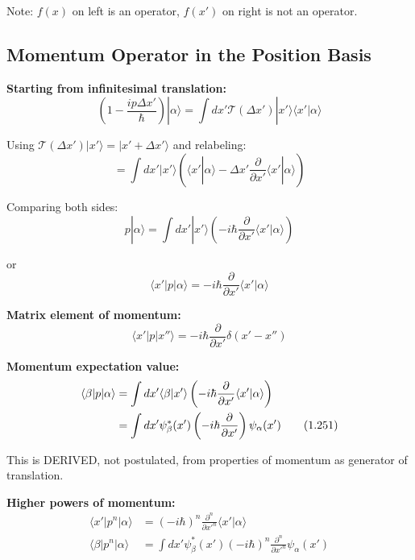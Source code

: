 \documentclass[11pt,a4paper]{article}
\begin{document}
Note: $f(x)$ on left is an operator, $f(x')$ on right is not an operator.

\subsection{Momentum Operator in the Position Basis}

\textbf{Starting from infinitesimal translation:}
\begin{equation}
\left(1 - \frac{ip\Delta x'}{\hbar}\right)|\alpha\rangle = \int dx'\mathcal{T}(\Delta x')|x'\rangle\langle x'|\alpha\rangle
\tag{1.247}
\end{equation}

Using $\mathcal{T}(\Delta x')|x'\rangle = |x' + \Delta x'\rangle$ and relabeling:
\begin{equation}
= \int dx'|x'\rangle\left(\langle x'|\alpha\rangle - \Delta x'\frac{\partial}{\partial x'}\langle x'|\alpha\rangle\right)
\end{equation}

Comparing both sides:
\begin{equation}
\boxed{p|\alpha\rangle = \int dx'|x'\rangle\left(-i\hbar\frac{\partial}{\partial x'}\langle x'|\alpha\rangle\right)}
\tag{1.248}
\end{equation}

or
\begin{equation}
\boxed{\langle x'|p|\alpha\rangle = -i\hbar\frac{\partial}{\partial x'}\langle x'|\alpha\rangle}
\tag{1.249}
\end{equation}

\textbf{Matrix element of momentum:}
\begin{equation}
\boxed{\langle x'|p|x''\rangle = -i\hbar\frac{\partial}{\partial x'}\delta(x' - x'')}
\tag{1.250}
\end{equation}

\textbf{Momentum expectation value:}
\begin{align}
\langle\beta|p|\alpha\rangle &= \int dx'\langle\beta|x'\rangle\left(-i\hbar\frac{\partial}{\partial x'}\langle x'|\alpha\rangle\right) \notag \\
&= \int dx'\psi_\beta^*(x')\left(-i\hbar\frac{\partial}{\partial x'}\right)\psi_\alpha(x')
\tag{1.251}
\end{align}

This is DERIVED, not postulated, from properties of momentum as generator of translation.

\textbf{Higher powers of momentum:}
\begin{align}
\langle x'|p^n|\alpha\rangle &= (-i\hbar)^n\frac{\partial^n}{\partial x'^n}\langle x'|\alpha\rangle \tag{1.252} \\
\langle\beta|p^n|\alpha\rangle &= \int dx'\psi_\beta^*(x')(-i\hbar)^n\frac{\partial^n}{\partial x'^n}\psi_\alpha(x') \tag{1.253}
\end{align}
\end{document}
